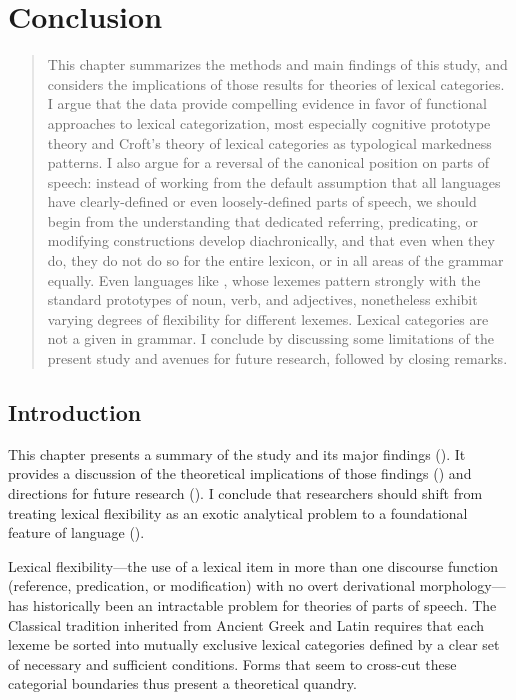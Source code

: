 \chapter{Conclusion}
\label{ch:conclusion}

\blockquote{This chapter summarizes the methods and main findings of this study, and considers the implications of those results for theories of lexical categories. I argue that the data provide compelling evidence in favor of functional approaches to lexical categorization, most especially cognitive prototype theory and Croft's theory of lexical categories as typological markedness patterns. I also argue for a reversal of the canonical position on parts of speech: instead of working from the default assumption that all languages have clearly-defined or even loosely-defined parts of speech, we should begin from the understanding that dedicated referring, predicating, or modifying constructions develop diachronically, and that even when they do, they do not do so for the entire lexicon, or in all areas of the grammar equally. Even languages like , whose lexemes pattern strongly with the standard prototypes of noun, verb, and adjectives, nonetheless exhibit varying degrees of flexibility for different lexemes. Lexical categories are not a given in grammar. I conclude by discussing some limitations of the present study and avenues for future research, followed by closing remarks.}

\section{Introduction}
\label{sec:5.1}

This chapter presents a summary of the study and its major findings (). It provides a discussion of the theoretical implications of those findings () and directions for future research (). I conclude that researchers should shift from treating lexical flexibility as an exotic analytical problem to a foundational feature of language ().

Lexical flexibility—the use of a lexical item in more than one discourse function (reference, predication, or modification) with no overt derivational morphology—has historically been an intractable problem for theories of parts of speech. The Classical tradition inherited from Ancient Greek and Latin requires that each lexeme be sorted into mutually exclusive lexical categories defined by a clear set of necessary and sufficient conditions. Forms that seem to cross-cut these categorial boundaries thus present a theoretical quandry.

